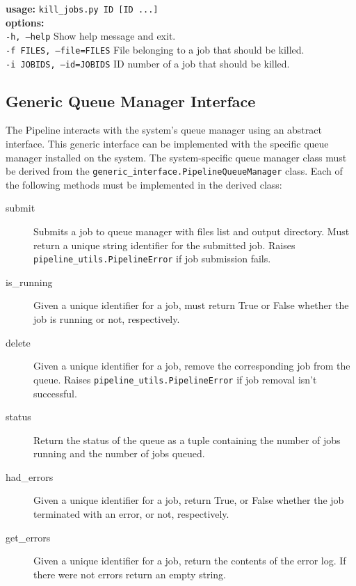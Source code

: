 \begin{itemize}
        \textbf{usage:} \texttt{kill\_jobs.py ID [ID ...]} \\
        \textbf{options:} \\
          \texttt{-h, --help}            Show help message and exit. \\
          \texttt{-f FILES, --file=FILES}  File belonging to a job that should be killed. \\
          \texttt{-i JOBIDS, --id=JOBIDS}  ID number of a job that should be killed.

\end{itemize}

\subsection{Generic Queue Manager Interface}
The Pipeline interacts with the system's queue manager using an abstract interface. This generic interface can be implemented with the specific queue manager installed on the system. The system-specific queue manager class must be derived from the \texttt{generic\_interface.PipelineQueueManager} class. Each of the following methods must be implemented in the derived class:

\begin{description}
    \item[submit] Submits a job to queue manager with files list and output directory. Must return a unique string identifier for the submitted job. Raises \texttt{pipeline\_utils.PipelineError} if job submission fails.

    \item[is\_running] Given a unique identifier for a job, must return True or False whether the job is running or not, respectively.

    \item[delete] Given a unique identifier for a job, remove the corresponding job from the queue. Raises \texttt{pipeline\_utils.PipelineError} if job removal isn't successful.

    \item[status] Return the status of the queue as a tuple containing the number of jobs running and the number of jobs queued.

    \item[had\_errors] Given a unique identifier for a job, return True, or False whether the job terminated with an error, or not, respectively.

    \item[get\_errors] Given a unique identifier for a job, return the contents of the error log. If there were not errors return an empty string.
\end{description}


